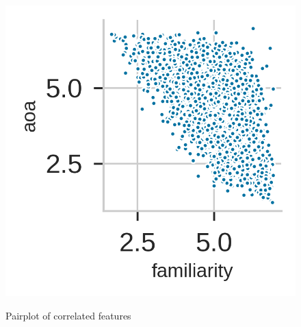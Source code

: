 \documentclass[a4paper,11pt,dvipsnames]{article}
\begin{document}
\begin{figure}[ht]
\begin{minipage}{0.3\textwidth}
    \centering
    \includegraphics[width=0.75\columnwidth]{Graphs/pp_aoa_familiarity.png}
    \label{fig:pairplot_aoa_fam}
        \end{minipage}
        \caption{Pairplot of correlated features}\label{fig:pairplot}
\end{figure}

\end{document}
